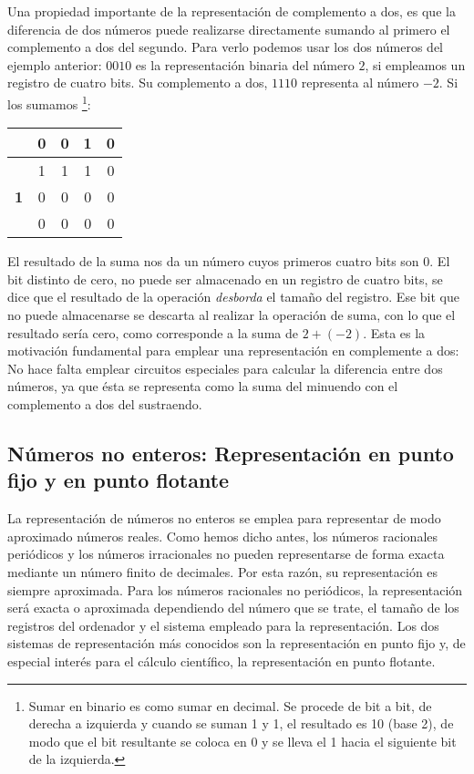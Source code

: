  Una propiedad importante de la representación de complemento a dos, es que la diferencia de dos números puede realizarse directamente sumando al primero el complemento a dos del segundo. Para verlo podemos usar los dos números del ejemplo anterior: $0010$ es la representación binaria del número $2$, si empleamos un registro de cuatro bits. Su complemento a dos, $1110$ representa al número $-2$. Si los sumamos  \footnote{Sumar en binario es como sumar en decimal. Se procede de bit a bit, de derecha a izquierda y cuando se suman 1 y 1, el resultado es 10 (base 2), de modo que el bit resultante se coloca en 0 y se lleva el 1 hacia el siguiente bit de la izquierda.}:

\begin{table}
 \centering
\begin{tabular}{|c|c|c|c|c|}
\hline
 &0&0&1&0\\
 \hline
  &1&1&1&0\\
  \hline
  \textbf{1}&0&0&0&0\\
  \hline
  \hline
  &0&0&0&0\\
  \hline
\end{tabular}
\end{table}

El resultado de la suma nos da un número cuyos primeros cuatro bits son 0. El bit distinto de cero, no puede ser almacenado en un registro de cuatro bits, se dice que el resultado de la operación \emph{desborda} el tamaño del registro. Ese bit que no puede almacenarse se descarta al realizar la operación de suma, con lo que el resultado sería cero, como corresponde a la suma de $2+(-2)$. Esta es la motivación fundamental para emplear una representación en complemente a dos: No hace falta emplear circuitos especiales para calcular la diferencia entre dos números, ya que ésta se representa como la suma del minuendo con el complemento a dos del sustraendo.

\subsection{Números no enteros: Representación en punto fijo y en punto flotante}
La representación de números no enteros se emplea para representar de modo aproximado números reales. Como hemos dicho antes, los números racionales periódicos y los números irracionales no pueden representarse de forma exacta mediante un número finito de decimales. Por esta razón, su representación es siempre aproximada. Para los números racionales no periódicos, la representación será exacta o aproximada dependiendo del número que se trate, el tamaño de los registros del ordenador y el sistema empleado para la representación. Los dos sistemas de representación más conocidos son la representación en  punto fijo y, de especial interés para el cálculo científico, la representación en punto flotante.

